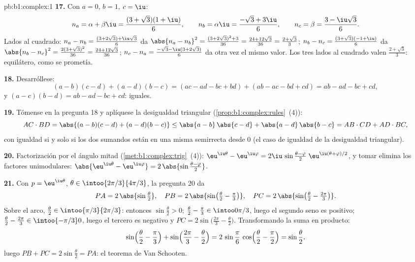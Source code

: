 \begin{solution}{pb:b1:complex:1}
\textbf{17.} Con $a = 0$, $b = 1$, $c = \iu$:
\[
n_a = \alpha + \beta\iu = \frac{(3 + \sqrt3)(1 + \iu)}6,
\qquad
n_b = \alpha\iu = \frac{-\sqrt3 + 3\iu}6,
\qquad
n_c = \beta = \frac{3 - \iu\sqrt3}6 .
\]
Lados al cuadrado: $n_a - n_b = \frac{(3 + 2\sqrt3) +
\iu\sqrt3}6$ da $\abs{n_a - n_b}^2 = \frac{(3 + 2\sqrt3)^2 +
3}{36} = \frac{24 + 12\sqrt3}{36} = \frac{2 + \sqrt3}3$;
$n_b - n_c = \frac{(3 + \sqrt3)(-1 + \iu)}6$ da $\abs{n_b - n_c}^2 =
\frac{2(3 + \sqrt3)^2}{36} = \frac{24 + 12\sqrt3}{36}$;
$n_c - n_a = \frac{-\sqrt3 - \iu(3 + 2\sqrt3)}6$ da otra vez el mismo
valor. Los tres lados al cuadrado valen $\frac{2 + \sqrt3}3$:
equilátero, como se prometía.

\textbf{18.} Desarróllese:
\[
(a - b)(c - d) + (a - d)(b - c)
= (ac - ad - bc + bd) + (ab - ac - bd + cd)
= ab - ad - bc + cd ,
\]
y $(a - c)(b - d) = ab - ad - bc + cd$: iguales.

\textbf{19.} Tómense  en la pregunta 18 y aplíquese la
desigualdad triangular (\cref{prop:b1:complex:rules}~(4)):
\[
AC \cdot BD = \abs{(a-b)(c-d) + (a-d)(b-c)}
\leq \abs{a-b}\,\abs{c-d} + \abs{a-d}\,\abs{b-c}
= AB \cdot CD + AD \cdot BC ,
\]
con igualdad si y solo si los dos sumandos están en una misma
semirrecta desde $0$ (el caso de igualdad de la desigualdad triangular).

\textbf{20.} Factorización por el ángulo mitad
(\cref{met:b1:complex:trig}~(4)):
$\eu^{\iu\theta} - \eu^{\iu\varphi} = 2\iu\,\sin\frac{\theta -
\varphi}2\;\eu^{\iu(\theta + \varphi)/2}$, y tomar  elimina los
factores unimodulares: $\abs{\eu^{\iu\theta} - \eu^{\iu\varphi}}
= 2\,\abs{\sin\frac{\theta - \varphi}2}$.

\textbf{21.} Con $p = \eu^{\iu\theta}$, $\theta \in
\intoo{2\pi/3}{4\pi/3}$, la pregunta 20 da
\[
PA = 2\,\abs{\sin\tfrac\theta2},
\quad
PB = 2\,\abs{\sin\bigl(\tfrac\theta2 - \tfrac\pi3\bigr)},
\quad
PC = 2\,\abs{\sin\bigl(\tfrac\theta2 - \tfrac{2\pi}3\bigr)} .
\]
Sobre el arco, $\frac\theta2 \in \intoo{\pi/3}{2\pi/3}$: entonces
$\sin\frac\theta2 > 0$; $\frac\theta2 - \frac\pi3 \in
\intoo0{\pi/3}$, luego el segundo seno es positivo; $\frac\theta2 -
\frac{2\pi}3 \in \intoo{-\pi/3}0$, luego el tercero es negativo y
$PC = 2\sin\bigl(\frac{2\pi}3 - \frac\theta2\bigr)$. Transformando la
suma en producto:
\[
\sin\Bigl(\frac\theta2 - \frac\pi3\Bigr) +
\sin\Bigl(\frac{2\pi}3 - \frac\theta2\Bigr)
= 2\,\sin\frac\pi6\,\cos\Bigl(\frac\theta2 - \frac\pi2\Bigr)
= \sin\frac\theta2 ,
\]
luego $PB + PC = 2\sin\frac\theta2 = PA$: el teorema de Van Schooten.


\end{solution}
